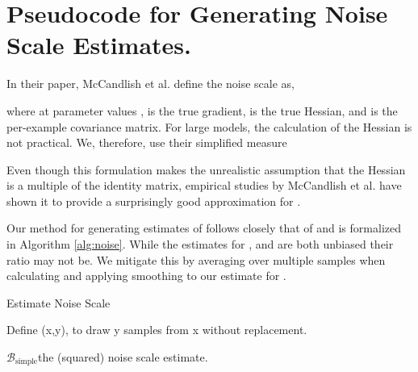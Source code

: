 \documentclass{article}
\newcommand{\bs}[0]{\ensuremath{\mathcal{B}_\text{simple}}\xspace}
\begin{document}
\section{Pseudocode for Generating Noise Scale Estimates.}
\label{app:noise_estimate}

In their paper, McCandlish et al. \cite{mccandlish2018empirical} define the noise scale as,

where at parameter values ,  is the true gradient,  is the true Hessian, and  is the per-example covariance matrix. For large models, the calculation of the Hessian is not practical. We, therefore, use their simplified measure 



Even though this formulation makes the unrealistic assumption that the Hessian is a multiple of the identity matrix, empirical studies by McCandlish et al. have shown it to provide a surprisingly good approximation for . 

Our method for generating estimates of  follows closely that of \cite{mccandlish2018empirical} and is formalized in Algorithm \ref{alg:noise}. 
While the estimates for , and  are both unbiased their ratio may not be. We mitigate this by averaging over multiple samples when calculating  and applying smoothing to our estimate for .



\begin{algorithm}[h]
    \caption{Estimate Noise Scale}
    \label{alg:noise}
    \begin{algorithmic}[1]
    \State Define (x,y), to draw y samples from x without replacement.
    \State 
    \State 
    
    \State 
    \For{}
        \State 
        \State 
    \EndFor
    \State 
    \label{line:est}
    
    \State 
    
    \State 
    \State  
    \State \Return \bs \Comment the (squared) noise scale estimate.
    \State \Return  {}
    
    \EndFunction
    \end{algorithmic}
\end{algorithm}
\end{document}
